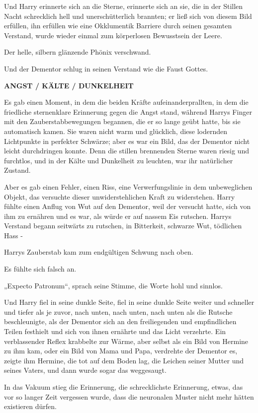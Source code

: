 {Und Harry erinnerte sich an die Sterne, erinnerte sich an sie, die in der Stillen Nacht schrecklich hell und unerschütterlich brannten; er ließ sich von diesem Bild erfüllen, ihn erfüllen wie eine Okklumentik Barriere durch seinen gesamten Verstand, wurde wieder einmal zum körperlosen Bewusstsein der Leere.

Der helle, silbern glänzende Phönix verschwand.

Und der Dementor schlug in seinen Verstand wie die Faust Gottes.

\textbf{\textbf{ANGST / KÄLTE / DUNKELHEIT}}

Es gab einen Moment, in dem die beiden Kräfte aufeinanderprallten, in dem die friedliche sternenklare Erinnerung gegen die Angst stand, während Harrys Finger mit den Zauberstabbewegungen begannen, die er so lange geübt hatte, bis sie automatisch kamen. Sie waren nicht warm und glücklich, diese lodernden Lichtpunkte in perfekter Schwärze; aber es war ein Bild, das der Dementor nicht leicht durchdringen konnte. Denn die stillen brennenden Sterne waren riesig und furchtlos, und in der Kälte und Dunkelheit zu leuchten, war ihr natürlicher Zustand.

Aber es gab einen Fehler, einen Riss, eine Verwerfungslinie in dem unbeweglichen Objekt, das versuchte dieser unwiderstehlichen Kraft zu widerstehen. Harry fühlte einen Anflug von Wut auf den Dementor, weil der versucht hatte, sich von ihm zu ernähren und es war, als würde er auf nassem Eis rutschen. Harrys Verstand begann seitwärts zu rutschen, in Bitterkeit, schwarze Wut, tödlichen Hass -

Harrys Zauberstab kam zum endgültigen Schwung nach oben.

Es fühlte sich falsch an.

„Expecto Patronum“, sprach seine Stimme, die Worte hohl und sinnlos.

Und Harry fiel in seine dunkle Seite, fiel in seine dunkle Seite weiter und schneller und tiefer als je zuvor, nach unten, nach unten, nach unten als die Rutsche beschleunigte, als der Dementor sich an den freiliegenden und empfindlichen Teilen festhielt und sich von ihnen ernährte und das Licht verzehrte. Ein verblassender Reflex krabbelte zur Wärme, aber selbst als ein Bild von Hermine zu ihm kam, oder ein Bild von Mama und Papa, verdrehte der Dementor es, zeigte ihm Hermine, die tot auf dem Boden lag, die Leichen seiner Mutter und seines Vaters, und dann wurde sogar das weggesaugt.

In das Vakuum stieg die Erinnerung, die schrecklichste Erinnerung, etwas, das vor so langer Zeit vergessen wurde, dass die neuronalen Muster nicht mehr hätten existieren dürfen.

}
